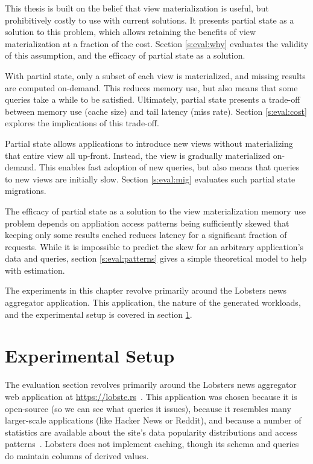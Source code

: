 This thesis is built on the belief that view materialization is useful, but
prohibitively costly to use with current solutions. It presents partial state as
a solution to this problem, which allows retaining the benefits of view
materialization at a fraction of the cost. Section \ref{s:eval:why} evaluates
the validity of this assumption, and the efficacy of partial state as a
solution.

With partial state, only a subset of each view is materialized, and missing
results are computed on-demand. This reduces memory use, but also means that
some queries take a while to be satisfied. Ultimately, partial state presents a
trade-off between memory use (cache size) and tail latency (miss rate). Section
\ref{s:eval:cost} explores the implications of this trade-off.

Partial state allows applications to introduce new views without materializing
that entire view all up-front. Instead, the view is gradually materialized
on-demand. This enables fast adoption of new queries, but also means that
queries to new views are initially slow. Section \ref{s:eval:mig} evaluates such
partial state migrations.

The efficacy of partial state as a solution to the view materialization memory
use problem depends on appliation access patterns being sufficiently skewed that
keeping only some results cached reduces latency for a significant fraction of
requests. While it is impossible to predict the skew for an arbitrary
application's data and queries, section \ref{s:eval:patterns} gives a simple
theoretical model to help with estimation.

The experiments in this chapter revolve primarily around the Lobsters
news aggregator application. This application, the nature of the generated
workloads, and the experimental setup is covered in section \ref{s:eval:setup}.

\section{Experimental Setup}
\label{s:eval:setup}

The evaluation section revolves primarily around the Lobsters news aggregator
web application at \url{https://lobste.rs}~\cite{lobsters}. This application was
chosen because it is open-source (so we can see what queries it issues), because
it resembles many larger-scale applications (like Hacker News or Reddit), and
because a number of statistics are available about the site's data popularity
distributions and access patterns~\cite{lobsters-data}. Lobsters does not
implement caching, though its schema and queries do maintain columns of derived
values.

